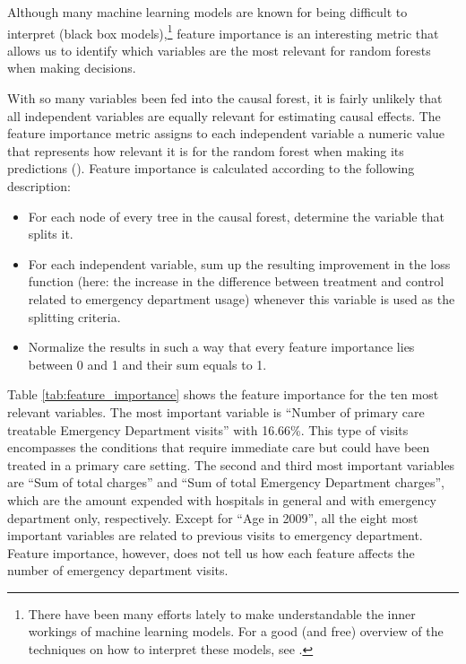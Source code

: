 Although many machine learning models are known for being difficult to interpret (black box models),\footnote{There have been many efforts lately to make understandable the inner workings of machine learning models. For a good (and free) overview of the techniques on how to interpret these models, see \cite{molnarInterpretableMachineLearning2019}.} feature importance is an interesting metric that allows us to identify which variables are the most relevant for random forests when making decisions.

With so many variables been fed into the causal forest, it is fairly unlikely that all independent variables are equally relevant for estimating causal effects. The feature importance metric assigns to each independent variable a numeric value that represents how relevant it is for the random forest when making its predictions (\cite{hastieElementsStatisticalLearning2009}). Feature importance is calculated according to the following description:

\begin{itemize}
  \item For each node of every tree in the causal forest, determine the variable that splits it. 
  \item For each independent variable, sum up the resulting improvement in the loss function (here: the increase in the difference between treatment and control related to emergency department usage) whenever this variable is used as the splitting criteria.
  \item Normalize the results in such a way that every feature importance lies between 0 and 1 and their sum equals to 1.
\end{itemize}

Table \ref{tab:feature_importance} shows the feature importance for the ten most relevant variables. The most important variable is ``Number of primary care treatable Emergency Department visits'' with 16.66\%. This type of visits encompasses the conditions that require immediate care but could have been treated in a primary care setting. The second and third most important variables are ``Sum of total charges'' and ``Sum of total Emergency Department charges'', which are the amount expended with hospitals in general and with emergency department only, respectively. Except for ``Age in 2009'', all the eight most important variables are related to previous visits to emergency department. Feature importance, however, does not tell us how each feature affects the number of emergency department visits. 


